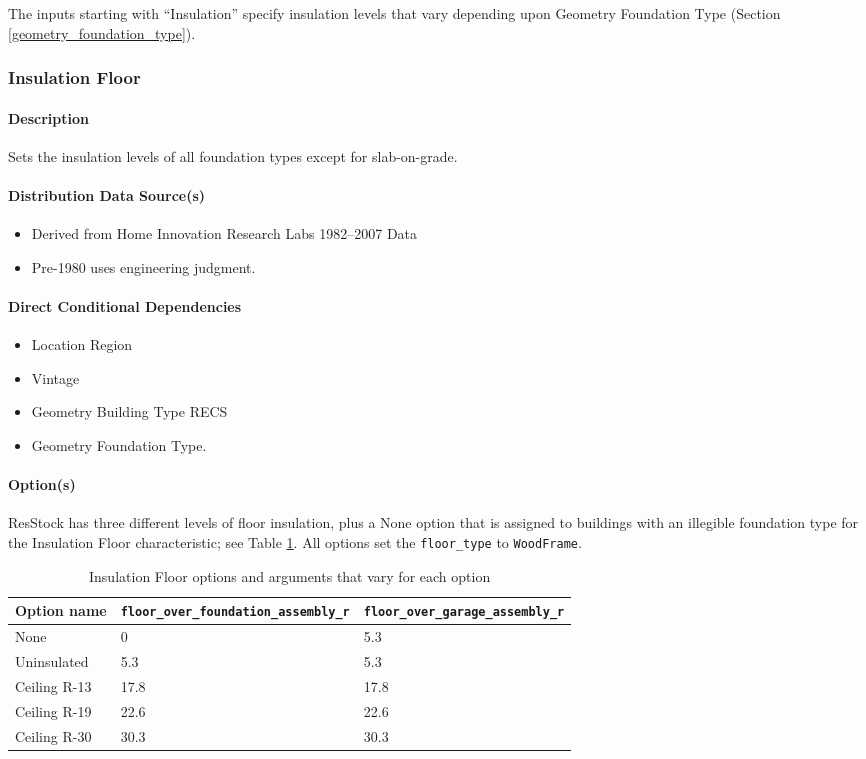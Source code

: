 The inputs starting with ``Insulation'' specify insulation levels that vary depending upon Geometry Foundation Type (Section \ref{geometry_foundation_type}). 
\subsubsection{Insulation Floor}\label{insulation_floor}
\paragraph{Description}
Sets the insulation levels of all foundation types except for slab-on-grade. 
\paragraph{Distribution Data Source(s)}
\begin{itemize}
 
\item
  Derived from Home Innovation Research Labs 1982--2007 Data
\item
  Pre-1980 uses engineering judgment.
\end{itemize}
\paragraph{Direct Conditional Dependencies}

\begin{itemize}
    \item Location Region
    \item Vintage
    \item Geometry Building Type RECS
    \item Geometry Foundation Type.
\end{itemize}
\paragraph{Option(s)}
ResStock has three different levels of floor insulation, plus a None option that is assigned to buildings with an illegible foundation type for the Insulation Floor characteristic; see Table \ref{table:hc_opt_ins_floor}. All options set the \texttt{floor\_type} to \texttt{WoodFrame}.

\begin{longtable}[]{|p{3.5cm}|p{3cm}|p{3cm}|} \caption{Insulation Floor options and arguments that vary for each option} \label{table:hc_opt_ins_floor} \\  
\toprule\noalign{}
Option name &
\texttt{floor\_over\_foundation\_assembly\_r} &
\texttt{floor\_over\_garage\_assembly\_r}  \\
\midrule\noalign{}
\endhead
\bottomrule\noalign{}
\endlastfoot
None & 0 & 5.3  \\
Uninsulated & 5.3 & 5.3  \\
Ceiling R-13 & 17.8 & 17.8  \\
Ceiling R-19 & 22.6 & 22.6 \\
Ceiling R-30 & 30.3 & 30.3  \\
\end{longtable}


